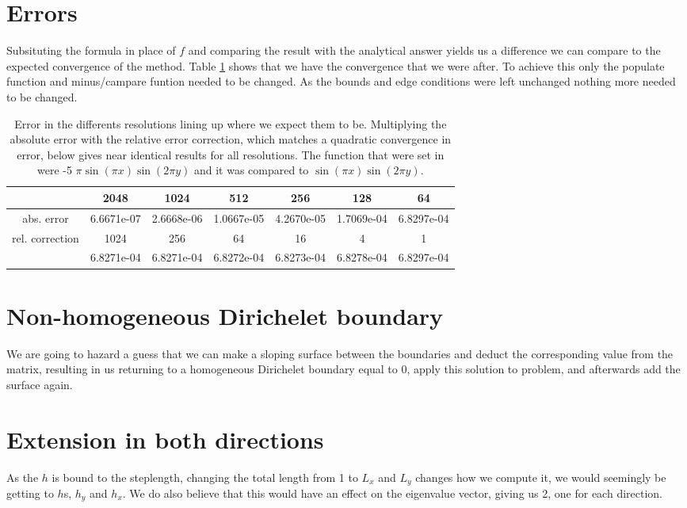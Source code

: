 \section{Errors}
Subsituting the formula in place of $f$ and comparing the result with the analytical answer yields us a difference we can compare to the expected convergence of the method. Table \ref{tab:relerr} shows that we have the convergence that we were after. To achieve this only the populate function and minus/campare funtion needed to be changed. As the bounds and edge conditions were left unchanged nothing more needed to be changed.  

\begin{table}[t]
\caption{\label{tab:relerr}Error in the differents resolutions lining up where we expect them to be. Multiplying the absolute error with the relative error correction, which matches a quadratic convergence in error, below gives near identical results for all resolutions. The function that were set in were -5 $\pi \sin(\pi x ) \sin(2\pi y)$ and it was compared to $\sin(\pi x ) \sin(2\pi y)$. }
\begin{tabular}{|c|c|c|c|c|c|c|}
\hline 
 &  2048 & 1024 & 512 & 256 & 128 & 64 \\ 
\hline 
abs. error &6.6671e-07  & 2.6668e-06 &  1.0667e-05  & 4.2670e-05 &  1.7069e-04 &  6.8297e-04\\
\hline 
rel. correction  & 1024 &   256   &  64   &  16  &    4   &   1\\
\hline 
& 6.8271e-04 &  6.8271e-04 &  6.8272e-04 &  6.8273e-04 &  6.8278e-04  & 6.8297e-04\\
\hline 
\end{tabular}
\end{table} 

\section{Non-homogeneous Dirichelet boundary} 
We are going to hazard a guess that we can make a sloping surface between the boundaries and deduct the corresponding value from the matrix, resulting in us returning to a homogeneous Dirichelet boundary equal to 0, apply this solution to problem, and afterwards add the surface again. 

\section{Extension in both directions}
As the $h$ is bound to the steplength, changing the total length from 1 to $L_x$ and $L_y$ changes how we compute it, we would seemingly be getting to $h$s, $h_y$ and $h_x$. We do also believe that this would have an effect on the eigenvalue vector, giving us 2, one for each direction. 